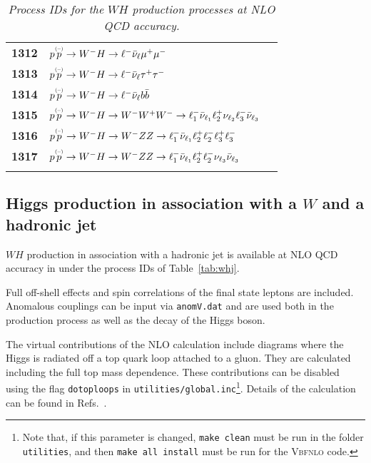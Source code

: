 \documentclass[english,12pt]{article}
\begin{document}
\begin{table}[t!]
\begin{center}
\begin{tabular}{c|l|l}
\bf 1312 & $p \overset{\mbox{\tiny{(--)}}}{p} \to W^- H \to \ell^- \bar{\nu}_{\ell} \mu^+\mu^- $ & \\
\bf 1313 & $p \overset{\mbox{\tiny{(--)}}}{p} \to W^- H \to \ell^- \bar{\nu}_{\ell} \tau^+\tau^- $ & \\
\bf 1314 & $p \overset{\mbox{\tiny{(--)}}}{p} \to W^- H \to \ell^- \bar{\nu}_{\ell} b\bar{b} $ & \\
\bf 1315 & $p \overset{\mbox{\tiny{(--)}}}{p} \to W^- H \to W^- W^{+}W^{-} \to \ell_{1}^-\bar{\nu}_{\ell_{1}} \ell_{2}^+\nu_{\ell_{2}} \ell_{3}^- \bar{\nu}_{\ell_{3}}$ &  \\
\bf 1316 & $p \overset{\mbox{\tiny{(--)}}}{p} \to W^- H \to W^- ZZ \to \ell_{1}^-\bar{\nu}_{\ell_{1}} \ell_{2}^+ \ell_{2}^- \ell_{3}^+ \ell_{3}^-$ & \\
\bf 1317 & $p \overset{\mbox{\tiny{(--)}}}{p} \to W^- H \to W^- ZZ \to \ell_{1}^-\bar{\nu}_{\ell_{1}} \ell_{2}^+ \ell_{2}^- \nu_{\ell_{3}}  \bar{\nu}_{\ell_{3}}$ & \\
&\\
\hline
\end{tabular}
\caption {\em  Process IDs for the $WH$ production processes at NLO QCD accuracy.}
\vspace{0.2cm}
\label{tab:wh}
\end{center}
\end{table}


\subsection{Higgs production in association with a $W$ and a hadronic jet}
\label{sec:whj}

$WH$ production in association with a hadronic jet is available at NLO QCD accuracy in
{} under the process IDs of Table~\ref{tab:whj}.

Full off-shell effects and spin correlations of the final state leptons are included. 
Anomalous couplings can be input via {\tt anomV.dat} and are used both in the production
process as well as the decay of the Higgs boson.

The virtual contributions of the NLO calculation include diagrams where the Higgs is
radiated off a top quark loop attached to a gluon.
They are calculated including the full top mass dependence.
These contributions can be disabled using the flag {\tt dotoploops} in 
{\tt utilities/global.inc}\footnote{Note
that, if this parameter is changed, {\tt make clean} must be run in
the folder {\tt utilities}, and then {\tt make all
install} must be run for the \textsc{Vbfnlo} code.}.
Details of the calculation can be found in Refs.~\cite{robin,Campanario:2014lza}.
\end{document}
